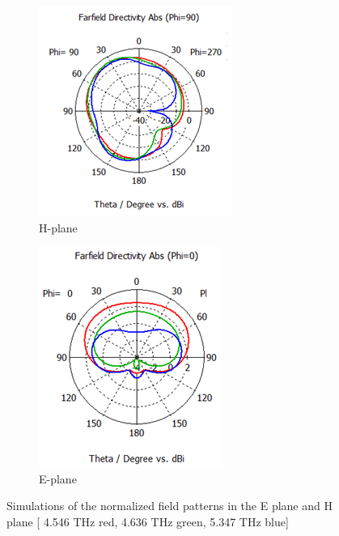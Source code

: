 \documentclass[12pt]{suhbook}
\begin{document}
\begin{figure}[hbt!]
\begin{subfigure}{.5\textwidth}
  \centering
  \includegraphics[width=.9\linewidth]{6}
  \caption{H-plane}
  \label{FIG 6}
\end{subfigure}%
\begin{subfigure}{.5\textwidth}
  \centering
  \includegraphics[width=.8\linewidth]{7}
  \caption{E-plane}
  \label{FIG 7}
\end{subfigure}
\caption{Simulations of the normalized field patterns in the E plane and H plane [ 4.546 THz red, 4.636 THz green, 5.347 THz blue]}
\label{fig:fig}
\end{figure}
\newpage
\end{document}
